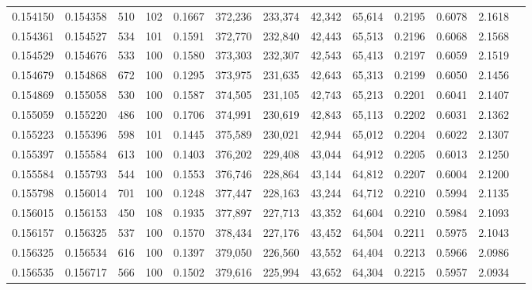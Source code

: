 \begin{tabular}{rrrrrrrrrrrrr}
0.154150 & 0.154358 &   510 & 102 &                                     0.1667 & 372,236 & 233,374 &  42,342 &  65,614 & 0.2195 & 0.6078 & 2.1618 \\
0.154361 & 0.154527 &   534 & 101 &                                     0.1591 & 372,770 & 232,840 &  42,443 &  65,513 & 0.2196 & 0.6068 & 2.1568 \\
0.154529 & 0.154676 &   533 & 100 &                                     0.1580 & 373,303 & 232,307 &  42,543 &  65,413 & 0.2197 & 0.6059 & 2.1519 \\
0.154679 & 0.154868 &   672 & 100 &                                     0.1295 & 373,975 & 231,635 &  42,643 &  65,313 & 0.2199 & 0.6050 & 2.1456 \\
0.154869 & 0.155058 &   530 & 100 &                                     0.1587 & 374,505 & 231,105 &  42,743 &  65,213 & 0.2201 & 0.6041 & 2.1407 \\
0.155059 & 0.155220 &   486 & 100 &                                     0.1706 & 374,991 & 230,619 &  42,843 &  65,113 & 0.2202 & 0.6031 & 2.1362 \\
0.155223 & 0.155396 &   598 & 101 &                                     0.1445 & 375,589 & 230,021 &  42,944 &  65,012 & 0.2204 & 0.6022 & 2.1307 \\
0.155397 & 0.155584 &   613 & 100 &                                     0.1403 & 376,202 & 229,408 &  43,044 &  64,912 & 0.2205 & 0.6013 & 2.1250 \\
0.155584 & 0.155793 &   544 & 100 &                                     0.1553 & 376,746 & 228,864 &  43,144 &  64,812 & 0.2207 & 0.6004 & 2.1200 \\
0.155798 & 0.156014 &   701 & 100 &                                     0.1248 & 377,447 & 228,163 &  43,244 &  64,712 & 0.2210 & 0.5994 & 2.1135 \\
0.156015 & 0.156153 &   450 & 108 &                                     0.1935 & 377,897 & 227,713 &  43,352 &  64,604 & 0.2210 & 0.5984 & 2.1093 \\
0.156157 & 0.156325 &   537 & 100 &                                     0.1570 & 378,434 & 227,176 &  43,452 &  64,504 & 0.2211 & 0.5975 & 2.1043 \\
0.156325 & 0.156534 &   616 & 100 &                                     0.1397 & 379,050 & 226,560 &  43,552 &  64,404 & 0.2213 & 0.5966 & 2.0986 \\
0.156535 & 0.156717 &   566 & 100 &                                     0.1502 & 379,616 & 225,994 &  43,652 &  64,304 & 0.2215 & 0.5957 & 2.0934 \\

\end{tabular}
